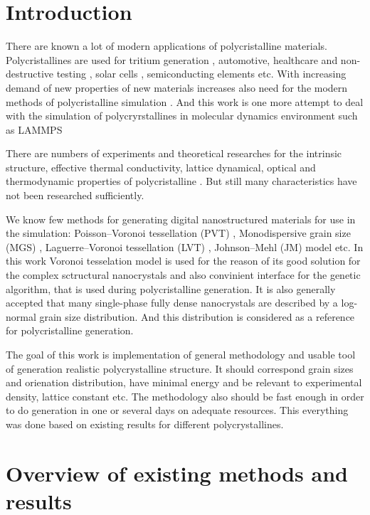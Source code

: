 \documentclass[12pt]{report}
\begin{document}
\section{Introduction}

There are known a lot of modern applications of polycristalline materials. Polycristallines are used for tritium generation \cite{john99}, automotive, healthcare and non-destructive testing \cite{pardo11}, solar cells \cite{schrop98}, semiconducting elements \cite{harb85} etc. With increasing demand of new properties of new materials increases also need for the modern methods of polycristalline simulation \cite{shen15}. And this work is one more attempt to deal with the simulation of polycryrstallines in molecular dynamics environment such as LAMMPS \cite{plimp95, plimp00}

There are numbers of experiments and theoretical researches for the intrinsic structure, effective thermal conductivity, lattice dynamical, optical and thermodynamic properties of polycristalline \cite{shen15}. But still many characteristics have not been researched sufficiently.

We know few methods for generating digital nanostructured materials for use in the simulation: Poisson–Voronoi tessellation (PVT) \cite{wear86}, Monodispersive grain size (MGS) \cite{wang96}, Laguerre–Voronoi tessellation (LVT) \cite{fan04}, Johnson–Mehl (JM) model \cite{okabe00} etc. In this work Voronoi tesselation model is used for the reason of its good solution for the complex sctructural nanocrystals and also convinient interface for the genetic algorithm, that is used during polycristalline generation. It is also generally accepted that many single-phase fully dense nanocrystals are described by a log-normal grain size distribution. And this distribution is considered as a reference for polycristalline generation.

The goal of this work is implementation of general methodology and usable tool of generation realistic polycrystalline structure. It should correspond grain sizes and orienation distribution, have minimal energy and be relevant to experimental density, lattice constant etc. The methodology also should be fast enough in order to do generation in one or several days on adequate resources. This everything was done based on existing results for different polycrystallines.

\section{Overview of existing methods and results}
\end{document}
